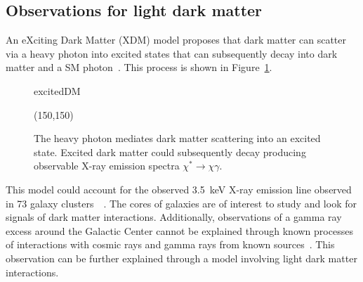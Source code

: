 \subsection{Observations for light dark matter}
An eXciting Dark Matter (XDM) model proposes that dark matter can scatter via a heavy photon into excited states that can subsequently decay into  dark matter and a SM photon~\cite{finkbeiner_x-ray_2014}. This process is shown in Figure~\ref{fig:excitation}.

\begin{figure}[htb]
    \begin{center}
	\begin{fmffile}{excitedDM}
	\begin{fmfgraph*}(150,150)
\end{fmfgraph*}
	\end{fmffile}
  	\end{center}
    	\caption[Heavy photon mediates dark matter scattering into an excited state]{The heavy photon mediates dark matter scattering into an excited state. Excited dark matter could subsequently decay producing observable X-ray emission spectra $\chi^{\ast}\rightarrow\chi\gamma$.}
   	 \label{fig:excitation}	
\end{figure}

This model could account for the observed 3.5~keV X-ray emission line observed in 73 galaxy clusters~\cite{bulbul_detection_2014}~\cite{boyarsky_unidentified_2014}. The cores of galaxies are of interest to study and look for signals of dark matter interactions.  Additionally, observations of a gamma ray excess around the Galactic Center cannot be explained through known processes of interactions with cosmic rays and gamma rays from known sources~\cite{Hooper:2010mq}. This observation can be further explained through a model involving light dark matter interactions. 

